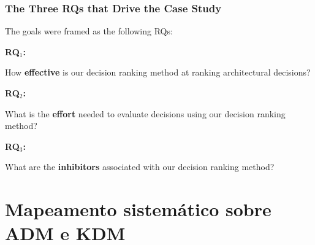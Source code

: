\documentclass{beamer}
\begin{document}
\begin{frame}[fragile]\frametitle{The Three RQs that Drive the Case Study}

The goals were framed as the following RQs: 


\begin{block}{\textbf{RQ$_1$:}}
\begin{minipage}[b]{10.80cm}
How \textbf{effective} is our decision ranking method at 
ranking architectural decisions?
\end{minipage}  
\end{block}


\begin{block}{\textbf{RQ$_2$:}}
\begin{minipage}[b]{10.80cm}
What is the \textbf{effort} needed to evaluate decisions using our decision ranking method? 
\end{minipage}  
\end{block}


\begin{block}{\textbf{RQ$_3$:}}
\begin{minipage}[b]{10.80cm}
What are the \textbf{inhibitors} associated with our decision ranking method?
\end{minipage}  
\end{block}

\end{frame}


\section{Mapeamento sistemático sobre ADM e KDM} 
\label{sec:mapeamentoConduzido}

\begin{frame}
  \center
\end{frame}
\end{document}
